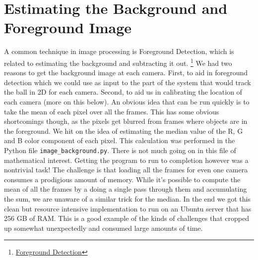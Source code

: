 \documentclass{article}
\begin{document}
\newpage
\section{Estimating the Background and Foreground Image}
A common technique in image processing is Foreground Detection, which is related to estimating the background and subtracting it out.
\footnote{\href{https://en.wikipedia.org/wiki/Foreground_detection}{Foreground Detection}}
We had two reasons to get the background image at each camera.  
First, to aid in foreground detection which we could use as input to the part of the system that would track the ball
in 2D for each camera.  Second, to aid us in calibrating the location of each camera (more on this below).
An obvious idea that can be run quickly is to take the mean of each pixel over all the frames.
This has some obvious shortcomings though, as the pixels get blurred from frames where objects are in the foreground.
We hit on the idea of estimating the median value of the R, G and B color component of each pixel.
This calculation was performed in the Python file \texttt{image\_background.py}.
There is not much going on in this file of mathematical interest.  
Getting the program to run to completion however was a nontrivial task!  
The challenge is that loading all the frames for even one camera  
consumes a prodigious amount of memory.  
While it's possible to compute the mean of all the frames by a doing a single pass through them
and accumulating the sum, we are unaware of a similar trick for the median.
In the end we got this clean but resource intensive implementation to run on an Ubuntu server that has 256 GB of RAM.  
This is a good example of the kinds of challenges that cropped up somewhat unexpectedly and consumed large amounts of time.
\end{document}
